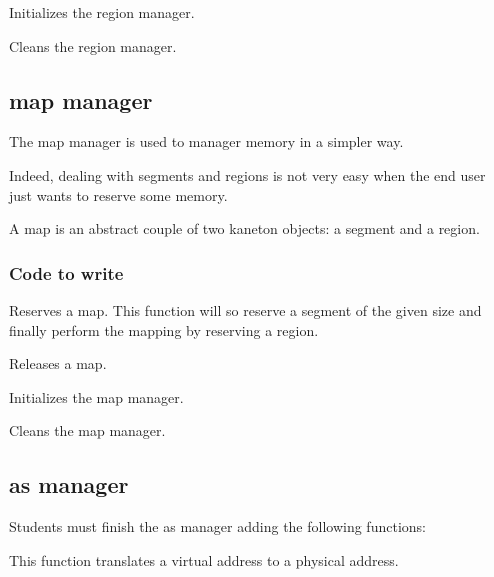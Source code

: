 	  {Initializes the region manager.}

	  {Cleans the region manager.}

\subsection{map manager}

The map manager is used to manager memory in a simpler way.

Indeed, dealing with segments and regions is not very easy when the
end user just wants to reserve some memory.

A map is an abstract couple of two kaneton objects: a segment and a region.

\subsubsection{Code to write}

	  {Reserves a map. This function will so reserve a segment of
	    the given size and finally perform the mapping by reserving
	    a region.}

	  {Releases a map.}

	  {Initializes the map manager.}

	  {Cleans the map manager.}

\subsection{as manager}

Students must finish the as manager adding the following functions:

	  {This function translates a virtual address to a physical address.}

